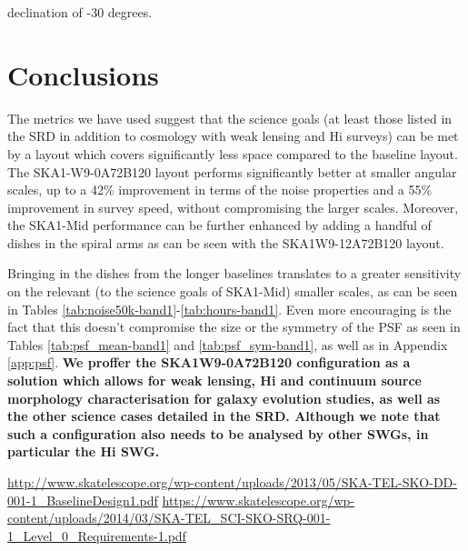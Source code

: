 \documentclass[sfheadings,a4paper,times,9pt,floats,floatfix]{article}
\begin{document}
declination of -30 degrees.









 
\newpage
\section{Conclusions}\label{sec:conclusion}
The metrics we have used suggest that the science goals (at least those listed in the SRD in addition to cosmology with weak
lensing and H{\sc i} surveys) can be met by a layout which covers significantly less space compared to the baseline layout. The
SKA1-W9-0A72B120 layout performs significantly better at smaller angular scales, up to a 42\% improvement in terms of the noise
properties and a 55\% improvement in survey speed, without compromising the larger scales. Moreover, the SKA1-Mid performance can
be further enhanced by adding a handful of dishes in the spiral arms as can be seen
with the SKA1W9-12A72B120 layout.

Bringing in the dishes from the longer baselines translates to a greater sensitivity on the relevant (to the
science goals of SKA1-Mid) smaller scales, as can be seen in Tables \ref{tab:noise50k-band1}-\ref{tab:hours-band1}. Even
more encouraging is
the fact that this doesn't compromise the size or the symmetry of the PSF as seen in Tables \ref{tab:psf_mean-band1} and
\ref{tab:psf_sym-band1}, as well as in Appendix \ref{app:psf}. {\bf We proffer the SKA1W9-0A72B120 configuration as a solution
which allows for weak lensing, H{\sc i}
and continuum source morphology characterisation for galaxy evolution studies, as well as the other science cases detailed in the
SRD. Although we note that such a configuration also needs to be analysed by other SWGs, in particular the H{\sc i} SWG.}

\begin{thebibliography}{99}
  \url{http://www.skatelescope.org/wp-content/uploads/2013/05/SKA-TEL-SKO-DD-001-1_BaselineDesign1.pdf}
  \url{https://www.skatelescope.org/wp-content/uploads/2014/03/SKA-TEL_SCI-SKO-SRQ-001-1_Level_0_Requirements-1.pdf}
\end{thebibliography}
\pagebreak
\appendix
\end{document}
